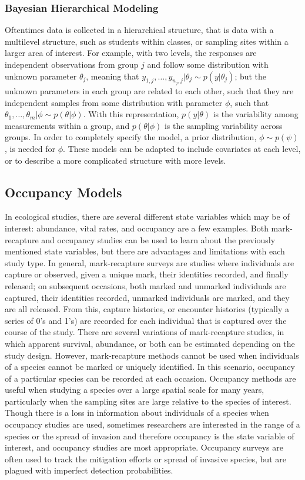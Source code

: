 \documentclass[12pt]{article}\usepackage[]{graphicx}\usepackage[]{color}
\begin{document}
\subsubsection{Bayesian Hierarchical Modeling}

Oftentimes data is collected in a hierarchical structure, that is data with a multilevel structure, such as students within classes, or sampling sites within a larger area of interest. For example, with two levels, the responses are independent observations from group $j$ and follow some distribution with unknown parameter $\theta_j$, meaning that $y_{1, j}, \dots, y_{n_j, j}|\theta_j \sim p(y|\theta_j)$; but the unknown parameters in each group are related to each other, such that they are independent samples from some distribution with parameter $\phi$, such that $\theta_1, \dots, \theta_m|\phi \sim p(\theta|\phi)$. With this representation, $p(y|\theta)$ is the variability among measurements within a group, and $p(\theta|\phi)$ is the sampling variability across groups. In order to completely specify the model, a prior distribution, $\phi \sim p(\psi)$, is needed for $\phi$. These models can be adapted to include covariates at each level, or to describe a more complicated structure with more levels. 

\subsection{Occupancy Models}

In ecological studies, there are several different state variables which may be of interest: abundance, vital rates, and occupancy are a few examples. Both mark-recapture and occupancy studies can be used to learn about the previously mentioned state variables, but there are advantages and limitations with each study type. In general, mark-recapture surveys are studies where individuals are capture or observed, given a unique mark, their identities recorded, and finally released; on subsequent occasions, both marked and unmarked individuals are captured, their identities recorded, unmarked individuals are marked, and they are all released. From this, capture histories, or encounter histories (typically a series of 0's and 1's) are recorded for each individual that is captured over the course of the study. There are several variations of mark-recapture studies, in which apparent survival, abundance, or both can be estimated depending on the study design. However, mark-recapture methods cannot be used when individuals of a species cannot be marked or uniquely identified. In this scenario, occupancy of a particular species can be recorded at each occasion. Occupancy methods are useful when studying a species over a large spatial scale for many years, particularly when the sampling sites are large relative to the species of interest. Though there is a loss in information about individuals of a species when occupancy studies are used, sometimes researchers are interested in the range of a species or the spread of invasion and therefore occupancy is the state variable of interest, and occupancy studies are most appropriate. Occupancy surveys are often used to track the mitigation efforts or spread of invasive species, but are plagued with imperfect detection probabilities. 
\end{document}

